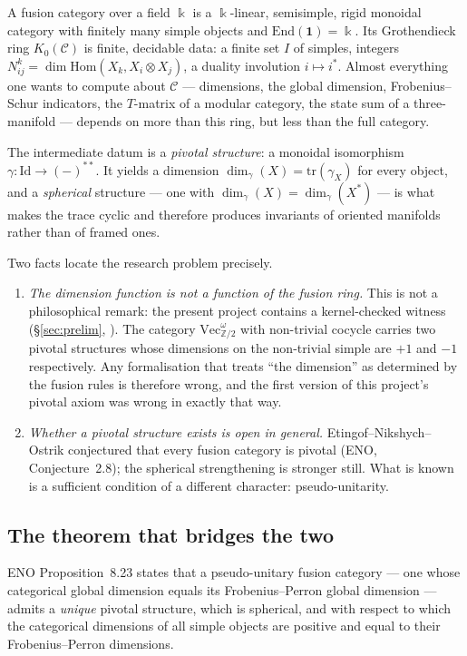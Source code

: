 \documentclass[11pt,a4paper]{article}
\theoremstyle{remark}
\newcommand{\code}[1]{\texttt{\detokenize{#1}}}
\newcommand{\C}{\mathcal{C}}
\newcommand{\Id}{\mathrm{Id}}
\newcommand{\Vect}{\mathrm{Vec}}
\newcommand{\one}{\mathbf{1}}
\newcommand{\dual}[1]{#1^{*}}
\newcommand{\field}{\Bbbk}
\newcommand{\Z}{\mathbb{Z}}
\begin{document}
A fusion category over a field $\field$ is a $\field$-linear, semisimple, rigid monoidal category with
finitely many simple objects and $\mathrm{End}(\one) = \field$. Its Grothendieck ring $K_0(\C)$ is
finite, decidable data: a finite set $I$ of simples, integers $N_{ij}^k = \dim \mathrm{Hom}(X_k, X_i
\otimes X_j)$, a duality involution $i \mapsto i^*$. Almost everything one wants to compute about
$\C$ --- dimensions, the global dimension, Frobenius--Schur indicators, the $T$-matrix of a
modular category, the state sum of a three-manifold --- depends on more than this ring, but less
than the full category.

The intermediate datum is a \emph{pivotal structure}: a monoidal isomorphism
$\gamma \colon \Id \to (-)^{**}$. It yields a dimension $\dim_\gamma(X) = \mathrm{tr}(\gamma_X)$
for every object, and a \emph{spherical} structure --- one with $\dim_\gamma(X) =
\dim_\gamma(\dual{X})$ --- is what makes the trace cyclic and therefore produces invariants of
oriented manifolds rather than of framed ones.

Two facts locate the research problem precisely.

\begin{enumerate}[label=(\alph*)]
\item \emph{The dimension function is not a function of the fusion ring.} This is not a
philosophical remark: the present project contains a kernel-checked witness
(\S\ref{sec:prelim}, \code{VecZ2Twisted}). The category $\Vect^\omega_{\Z/2}$ with non-trivial
cocycle carries two pivotal structures whose dimensions on the non-trivial simple are $+1$ and
$-1$ respectively. Any formalisation that treats ``the dimension'' as determined by the fusion
rules is therefore wrong, and the first version of this project's pivotal axiom was wrong in
exactly that way.
\item \emph{Whether a pivotal structure exists is open in general.} Etingof--Nikshych--Ostrik
conjectured that every fusion category is pivotal (ENO, Conjecture~2.8); the spherical
strengthening is stronger still. What is known is a sufficient condition of a different
character: pseudo-unitarity.
\end{enumerate}

\subsection{The theorem that bridges the two}

ENO Proposition~8.23 states that a pseudo-unitary fusion category --- one whose categorical
global dimension equals its Frobenius--Perron global dimension --- admits a \emph{unique}
pivotal structure, which is spherical, and with respect to which the categorical dimensions of
all simple objects are positive and equal to their Frobenius--Perron dimensions.
\end{document}
